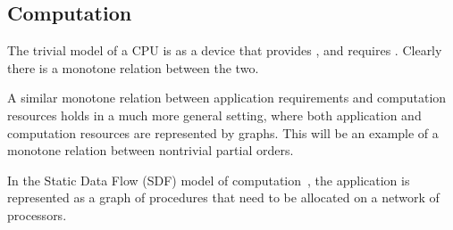 \begin{figure}[h]
  \caption{}
\end{figure}



\subsection{Computation}


The trivial model of a CPU is as a device that provides , and requires . Clearly there
is a monotone relation between the two.

\begin{figure}[h]
  \begin{center}
  \end{center}
  \caption{}
\end{figure}

A similar monotone relation between application requirements and computation
resources holds in a much more general setting, where both application
and computation resources are represented by graphs. This will be
an example of a monotone relation between nontrivial partial orders.

In the Static Data Flow (SDF) model of computation~\cite[Chapter 3]{sriram00,lee10},
the application is represented as a graph of procedures that need
to be allocated on a network of processors.

\begin{figure}[h]
  \begin{center}
  \end{center}
  \caption{}
\end{figure}


